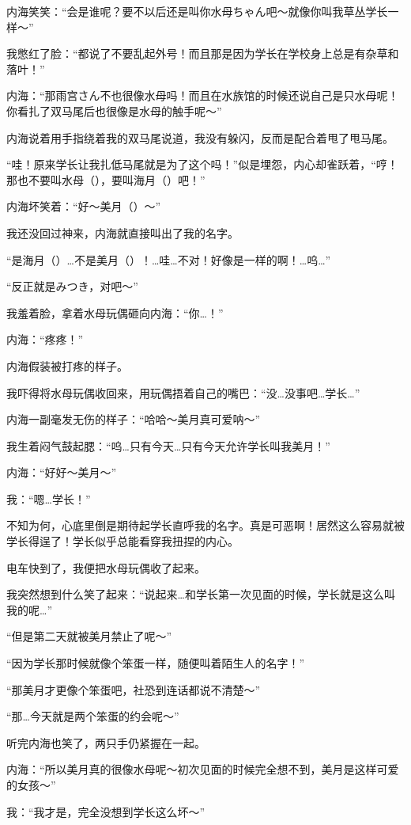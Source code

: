 内海笑笑：“会是谁呢？要不以后还是叫你水母ちゃん吧～就像你叫我草丛学长一样～”

我憋红了脸：“都说了不要乱起外号！而且那是因为学长在学校身上总是有杂草和落叶！”

内海：“那雨宫さん不也很像水母吗！而且在水族馆的时候还说自己是只水母呢！你看扎了双马尾后也很像是水母的触手呢～”

内海说着用手指绕着我的双马尾说道，我没有躲闪，反而是配合着甩了甩马尾。

“哇！原来学长让我扎低马尾就是为了这个吗！”似是埋怨，内心却雀跃着，“哼！那也不要叫水母（），要叫海月（）吧！”

内海坏笑着：“好～美月（）～”

我还没回过神来，内海就直接叫出了我的名字。

“是海月（）…不是美月（）！…哇…不对！好像是一样的啊！…呜…”

“反正就是みつき，对吧～”

我羞着脸，拿着水母玩偶砸向内海：“你…！”

内海：“疼疼！”

内海假装被打疼的样子。

我吓得将水母玩偶收回来，用玩偶捂着自己的嘴巴：“没…没事吧…学长…”

内海一副毫发无伤的样子：“哈哈～美月真可爱呐～”

我生着闷气鼓起腮：“呜…只有今天…只有今天允许学长叫我美月！”

内海：“好好～美月～”

我：“嗯…学长！”

不知为何，心底里倒是期待起学长直呼我的名字。真是可恶啊！居然这么容易就被学长得逞了！学长似乎总能看穿我扭捏的内心。

电车快到了，我便把水母玩偶收了起来。

我突然想到什么笑了起来：“说起来…和学长第一次见面的时候，学长就是这么叫我的呢…”

“但是第二天就被美月禁止了呢～”

“因为学长那时候就像个笨蛋一样，随便叫着陌生人的名字！”

“那美月才更像个笨蛋吧，社恐到连话都说不清楚～”

“那…今天就是两个笨蛋的约会呢～”

听完内海也笑了，两只手仍紧握在一起。

内海：“所以美月真的很像水母呢～初次见面的时候完全想不到，美月是这样可爱的女孩～”

我：“我才是，完全没想到学长这么坏～”

